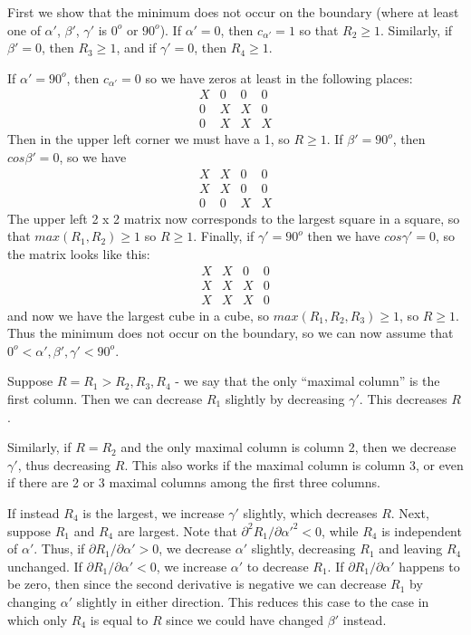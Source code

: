 First we show that the minimum does not occur on the boundary
(where at least one of $\alpha'$, $\beta'$, $\gamma'$
is $0^o$ or $90^o$).  If $\alpha' = 0$, then $c_{\alpha'} = 1$ so
that $R_2 \geq 1$. Similarly, if $\beta' = 0$, then $R_3 \geq 1$, and
if $\gamma' = 0$, then $R_4 \geq 1$.

If $\alpha' = 90^o$, then $c_{\alpha'} = 0$ so we have zeros at least in the
following places:
\begin{equation*}
\begin{matrix}
X & 0 & 0 & 0 \\
0 & X & X & 0 \\
0 & X & X & X
\end{matrix}
\end{equation*}
Then in the upper left corner we must have a 1, so $R \geq 1$. If
$\beta' = 90^o$, then $cos\beta' = 0$, so we have
\begin{equation*}
\begin{matrix}
X & X & 0 & 0 \\
X & X & 0 & 0 \\
0 & 0 & X & X
\end{matrix}
\end{equation*}
The upper left 2 x 2 matrix now corresponds to the largest square in a
square, so that $max(R_1,R_2) \geq 1$ so $R \geq 1$. Finally, if
$\gamma' = 90^o$ then we have $cos\gamma' = 0$, so the matrix looks like
this:
\begin{equation*}
\begin{matrix}
X & X & 0 & 0 \\
X & X & X & 0 \\
X & X & X & 0
\end{matrix}
\end{equation*}
and now we have the largest cube in a cube, so $max(R_1,R_2,R_3) \geq 1$,
so $R \geq 1$. Thus the minimum does not occur on the boundary, so we can now
assume that $0^o < \alpha', \beta', \gamma' < 90^o$.

Suppose $R = R_1 > R_2, R_3, R_4$ - we say that the only ``maximal column'' is
the first column.  Then we can decrease $R_1$ slightly by decreasing $\gamma'$.
This decreases $R$.

Similarly, if $R = R_2$ and the only maximal column is column 2, then
we decrease $\gamma'$, thus decreasing $R$.  This also works if the maximal
column is column 3, or even if there are 2 or 3 maximal columns among the
first three columns.

If instead $R_4$ is the largest, we increase $\gamma'$ slightly, which
decreases $R$.  Next, suppose $R_1$ and $R_4$ are largest.  Note that
$\partial^2 R_1 / \partial {\alpha'}^2 < 0$, while $R_4$ is independent of
$\alpha'$.  Thus, if $\partial R_1  / \partial \alpha' > 0$, we decrease
$\alpha'$ slightly, decreasing $R_1$ and leaving $R_4$ unchanged.  If
$\partial R_1  / \partial \alpha' < 0$, we increase $\alpha'$ to decrease
$R_1$.  If $\partial R_1  / \partial \alpha'$ happens to be zero, then since
the second derivative is negative we can decrease $R_1$ by changing $\alpha'$
slightly in either direction.  This reduces this case to the case in which
only $R_4$ is equal to $R$ since we could have changed $\beta'$ instead.

